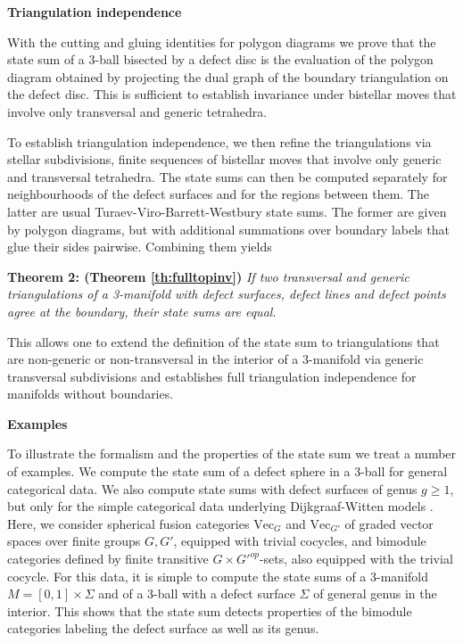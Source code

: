 \documentclass[1.5pt, a4paper]{article}
\begin{document}
\medskip
{\bf Triangulation independence}

With the cutting and gluing identities for polygon diagrams we prove that the state sum of a 3-ball bisected by a defect disc is the evaluation of the polygon diagram obtained by projecting the dual graph of the boundary triangulation on the defect disc.  This is sufficient to establish invariance under bistellar moves that involve only transversal and generic tetrahedra.  


To establish  triangulation independence, we then refine the triangulations via stellar subdivisions, finite sequences of bistellar moves that involve only generic and transversal tetrahedra. The state sums can then be computed separately for neighbourhoods of the defect surfaces and for the regions between them. The latter are usual Turaev-Viro-Barrett-Westbury state sums.  The former are given by polygon diagrams, but  with additional summations over  boundary labels  that glue their sides pairwise. 
Combining them yields

{\bf Theorem 2: (Theorem \ref{th:fulltopinv})}
\emph{
If two transversal and generic triangulations of a 3-manifold with defect surfaces, defect lines and defect points agree at the boundary, their state sums are equal.}

This allows one to extend the definition of the state sum to triangulations that are non-generic or non-transversal in the interior of a 3-manifold via generic transversal subdivisions and establishes full triangulation independence for manifolds without boundaries. 

\medskip
{\bf Examples} 

To illustrate the formalism and the properties of the state sum we treat a number of examples.  We compute the state sum of a defect sphere  in a 3-ball for general categorical data. We also compute state sums with defect surfaces  of genus $g\geq 1$, but only for the simple categorical data underlying  Dijkgraaf-Witten models \cite{DW}. Here, we consider spherical fusion categories $\mathrm{Vec}_G$ and $\mathrm{Vec}_{G'}$ of graded vector spaces over finite groups $G, G'$, equipped with trivial cocycles, and bimodule categories defined by finite transitive $G\times G'^{op}$-sets, also equipped with the trivial cocycle. 
For this data, it is simple to 
compute the state sums of a 3-manifold $M=[0,1]\times\Sigma$ and of a 3-ball with a defect surface $\Sigma$ of general genus in the interior. This shows that the state sum detects properties of the bimodule categories labeling the defect surface as well as its  genus. 
\end{document}
